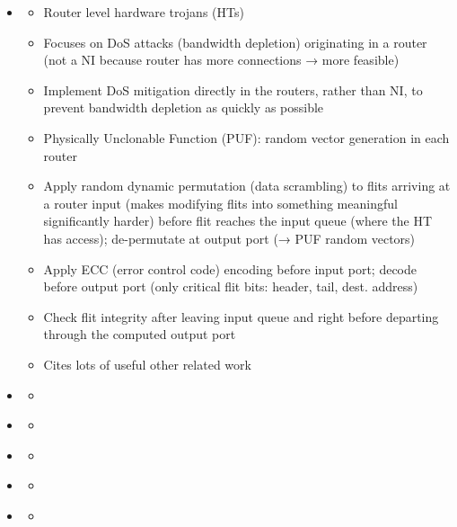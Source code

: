 \documentclass[
	paper=a4,
	fontsize=11pt,
	parskip=full %
]{scrreprt}
\begin{document}
\begin{itemize}
\begin{itemize}
            \end{itemize}
        \item \textbf{}
            \begin{itemize}
                \item Router level hardware trojans (HTs)
                \item Focuses on DoS attacks (bandwidth depletion) originating in a router (not a NI because router has more connections → more
                    feasible)
                \item Implement DoS mitigation directly in the routers, rather than NI, to prevent bandwidth depletion as quickly as possible
                \item Physically Unclonable Function (PUF): random vector generation in each router
                \item Apply random dynamic permutation (data scrambling) to flits arriving at a router input (makes modifying flits into something
                    meaningful significantly harder) before flit reaches the input queue (where the HT has access); de-permutate at output port (→
                    PUF random vectors)
                \item Apply ECC (error control code) encoding before input port; decode before output port (only critical flit bits: header, tail,
                    dest. address)
                \item Check flit integrity after leaving input queue and right before departing through the computed output port
                \item Cites lots of useful other related work
            \end{itemize}
        \item \textbf{}
            \begin{itemize}
                \item
            \end{itemize}
        \item \textbf{}
            \begin{itemize}
                \item
            \end{itemize}
        \item \textbf{}
            \begin{itemize}
                \item
            \end{itemize}
        \item \textbf{}
            \begin{itemize}
                \item
            \end{itemize}
        \item \textbf{}
            \begin{itemize}
                \item
            \end{itemize}
    \end{itemize}
\end{document}
